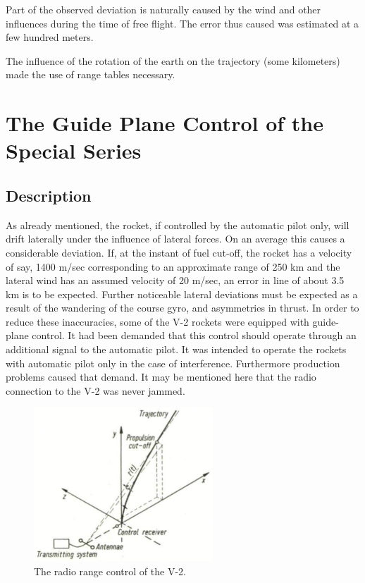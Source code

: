 \documentclass[12pt, a4paper]{article}
\begin{document}
Part of the observed deviation is naturally caused by the wind and other influences during the time of free flight. The error thus caused was estimated at a few hundred meters.

The influence of the rotation of the earth on the trajectory (some kilometers) made the use of range tables necessary.

\section{The Guide Plane Control of the Special Series}

\subsection{Description}

As already mentioned, the rocket, if controlled by the automatic pilot only, will drift laterally under the influence of lateral forces. On an average this causes a considerable deviation. If, at the instant of fuel cut-off, the rocket has a velocity of say, 1400 m/sec corresponding to an approximate range of 250 km and the lateral wind has an assumed velocity of 20 m/sec, an error in line of about 3.5 km is to be expected. Further noticeable lateral deviations must be expected as a result of the wandering of the course gyro, and asymmetries in thrust. In order to reduce these inaccuracies, some of the V-2 rockets were equipped with guide-plane control. It had been demanded that this control should operate through an additional signal to the automatic pilot. It was intended to operate the rockets with automatic pilot only in the case of interference. Furthermore production problems caused that demand. It may be mentioned here that the radio connection to the V-2 was never jammed.

\begin{figure}[ht]
  \centering
  \includegraphics[width=0.6\textwidth]{figs/ctrl-09.png}
  \caption{The radio range control of the V-2.}
  \label{fig:09}
\end{figure}
\end{document}
